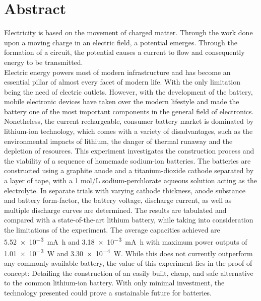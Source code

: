 \section{Abstract}
Electricity is based on the movement of charged matter. Through the work done upon a moving charge in an electric field, a potential emerges. Through the formation of a circuit, the potential causes a current to flow and consequently energy to be transmitted\cite{Kammer2019}.\\
Electric energy powers most of modern infrastructure and has become an essential pillar of almost every facet of modern life. With the only limitation being the need of electric outlets. However, with the development of the battery, mobile electronic devices have taken over the modern lifestyle and made the battery one of the most important components in the general field of electronics. Nonetheless, the current rechargeable, consumer battery market is dominated by lithium-ion technology, which comes with a variety of disadvantages, such as the environmental impacts of lithium, the danger of thermal runaway and the depletion of resources\cite{Peters2017, Peters2016, Wang2012}. This experiment investigates the construction process and the viability of a sequence of homemade sodium-ion batteries. The batteries are constructed using a graphite anode and a titanium-dioxide cathode separated by a layer of tape, with a 1 mol/L sodium-perchlorate aqueous solution acting as the electrolyte. In separate trials with varying cathode thickness, anode substance and battery form-factor, the battery voltage, discharge current, as well as multiple discharge curves are determined. The results are tabulated and compared with a state-of-the-art lithium battery, while taking into consideration the limitations of the experiment. The average capacities achieved are \SI{5.52e-3}{\mA\hour} and \SI{3.18e-3}{\mA\hour} with maximum power outputs of \SI{1.01e-3}{\W} and \SI{3.30e-4}{\W}. While this does not currently outperform any commonly available battery, the value of this experiment lies in the proof of concept: Detailing the construction of an easily built, cheap, and safe alternative to the common lithium-ion battery. With only minimal investment, the technology presented could prove a sustainable future for batteries.